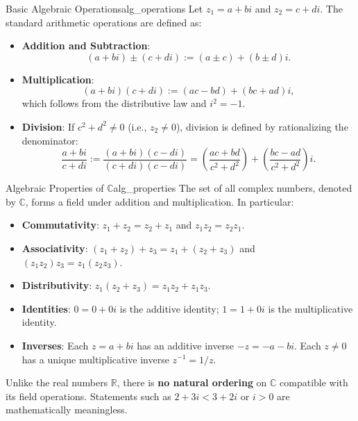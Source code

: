\begin{proposition}{Basic Algebraic Operations}{alg_operations}
Let $z_1 = a + bi$ and $z_2 = c + di$. The standard arithmetic operations are defined as:
\begin{itemize}
    \item \textbf{Addition and Subtraction}:
    \begin{equation}
    (a + bi) \pm (c + di) := (a \pm c) + (b \pm d)i.
    \end{equation}
    \item \textbf{Multiplication}:
    \begin{equation}
    (a + bi)(c + di) := (ac - bd) + (bc + ad)i,
    \end{equation}
    which follows from the distributive law and $i^2 = -1$.
    \item \textbf{Division}: If $c^2 + d^2 \neq 0$ (i.e., $z_2 \neq 0$), division is defined by rationalizing the denominator:
    \begin{equation}
    \frac{a + bi}{c + di} := \frac{(a + bi)(c - di)}{(c + di)(c - di)} = \left(\frac{ac + bd}{c^2 + d^2}\right) + \left(\frac{bc - ad}{c^2 + d^2}\right)i.
    \end{equation}
\end{itemize}
\end{proposition}

\begin{proposition}{Algebraic Properties of $\mathbb{C}$}{alg_properties}
The set of all complex numbers, denoted by $\mathbb{C}$, forms a field under addition and multiplication. In particular:
\begin{itemize}
    \item \textbf{Commutativity}: $z_1 + z_2 = z_2 + z_1$ and $z_1 z_2 = z_2 z_1$.
    \item \textbf{Associativity}: $(z_1 + z_2) + z_3 = z_1 + (z_2 + z_3)$ and $(z_1 z_2)z_3 = z_1(z_2 z_3)$.
    \item \textbf{Distributivity}: $z_1(z_2 + z_3) = z_1 z_2 + z_1 z_3$.
    \item \textbf{Identities}: $0 = 0 + 0i$ is the additive identity; $1 = 1 + 0i$ is the multiplicative identity.
    \item \textbf{Inverses}: Each $z = a + bi$ has an additive inverse $-z = -a - bi$. Each $z \neq 0$ has a unique multiplicative inverse $z^{-1} = 1/z$.
\end{itemize}
\end{proposition}

\begin{remark}
Unlike the real numbers $\mathbb{R}$, there is \textbf{no natural ordering} on $\mathbb{C}$ compatible with its field operations. Statements such as $2 + 3i < 3 + 2i$ or $i > 0$ are mathematically meaningless.
\end{remark}

